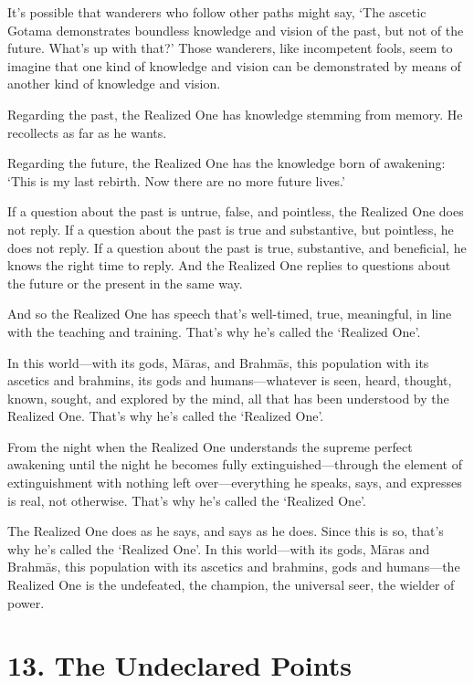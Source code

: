 \documentclass[12pt,openany]{book}%
\begin{document}
It’s possible that wanderers who follow other paths might say, ‘The ascetic Gotama demonstrates boundless knowledge and vision of the past, but not of the future. What’s up with that?’ Those wanderers, like incompetent fools, seem to imagine that one kind of knowledge and vision can be demonstrated by means of another kind of knowledge and vision. 

Regarding the past, the Realized One has knowledge stemming from memory. He recollects as far as he wants. 

Regarding the future, the Realized One has the knowledge born of awakening: ‘This is my last rebirth. Now there are no more future lives.’ 

If a question about the past is untrue, false, and pointless, the Realized One does not reply. If a question about the past is true and substantive, but pointless, he does not reply. If a question about the past is true, substantive, and beneficial, he knows the right time to reply. And the Realized One replies to questions about the future or the present in the same way. 

And so the Realized One has speech that’s well-timed, true, meaningful, in line with the teaching and training. That’s why he’s called the ‘Realized One’. 

In this world—with its gods, \textsanskrit{Māras}, and \textsanskrit{Brahmās}, this population with its ascetics and brahmins, its gods and humans—whatever is seen, heard, thought, known, sought, and explored by the mind, all that has been understood by the Realized One. That’s why he’s called the ‘Realized One’. 

From the night when the Realized One understands the supreme perfect awakening until the night he becomes fully extinguished—through the element of extinguishment with nothing left over—everything he speaks, says, and expresses is real, not otherwise. That’s why he’s called the ‘Realized One’. 

The Realized One does as he says, and says as he does. Since this is so, that’s why he’s called the ‘Realized One’. In this world—with its gods, \textsanskrit{Māras} and \textsanskrit{Brahmās}, this population with its ascetics and brahmins, gods and humans—the Realized One is the undefeated, the champion, the universal seer, the wielder of power. 

\section*{13. The Undeclared Points }
\end{document}
